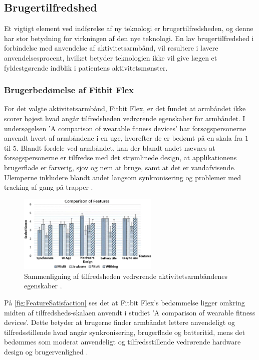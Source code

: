 \subsection{Brugertilfredshed}

Et vigtigt element ved indførelse af ny teknologi er brugertilfredsheden, og denne har stor betydning for virkningen af den nye teknologi. En lav brugertilfredshed i forbindelse med anvendelse af aktivitetsarmbånd, vil resultere i lavere anvendelsesprocent, hvilket betyder teknologien ikke vil give lægen et fyldestgørende indblik i patientens aktivitetsmønster.

\subsubsection{Brugerbedømelse af Fitbit Flex}

For det valgte aktivitetsarmbånd, Fitbit Flex, er det fundet at armbåndet ikke scorer højest hvad angår tilfredsheden vedrørende egenskaber for armbåndet. I undersøgelsen 'A comparison of wearable fitness devices' har forsøgspersonerne anvendt hvert af armbåndene i en uge, hvorefter de er bedømt på en skala fra $1$ til $5$. Blandt fordele ved armbåndet, kan der blandt andet nævnes at forsøgspersonerne er tilfredse med det strømlinede design, at applikationens brugerflade er farverig, sjov og nem at bruge, samt at det er vandafvisende. Ulemperne inkludere blandt andet langsom synkronisering og problemer med tracking af gang på trapper \citep{kaewkannate2016}.

\begin{figure}[H]
	\centering
	\includegraphics[width=0.6\textwidth]{figures/FeatureSatisfaction}
	\caption{Sammenligning af tilfredsheden vedrørende aktivitetsarmbåndenes egenskaber \citep{kaewkannate2016}.}
	\label{fig:FeatureSatisfaction}
\end{figure}

På \autoref{fig:FeatureSatisfaction} ses det at Fitbit Flex's bedømmelse ligger omkring midten af tilfredsheds-skalaen anvendt i studiet 'A comparison of wearable fitness devices'. Dette betyder at brugerne finder armbåndet lettere anvendeligt og tilfredsstillende hvad angår synkronisering, brugerflade og batteritid, mens det bedømmes som moderat anvendeligt og tilfredsstillende vedrørende hardware design og brugervenlighed \citep{kaewkannate2016}.


